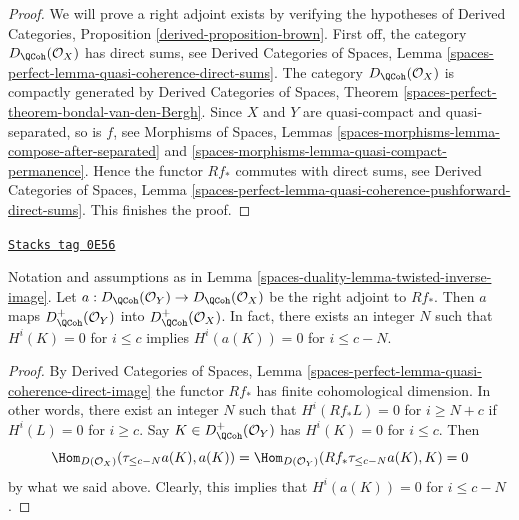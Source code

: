 \begin{proof}
We will prove a right adjoint exists by verifying the hypotheses of
Derived Categories, Proposition \ref{derived-proposition-brown}.
First off, the category $D_\QCoh(\mathcal{O}_X)$ has direct sums, see
Derived Categories of Spaces, Lemma
\ref{spaces-perfect-lemma-quasi-coherence-direct-sums}.
The category $D_\QCoh(\mathcal{O}_X)$ is compactly generated by
Derived Categories of Spaces, Theorem
\ref{spaces-perfect-theorem-bondal-van-den-Bergh}.
Since $X$ and $Y$ are quasi-compact and quasi-separated, so is $f$, see
Morphisms of Spaces, Lemmas
\ref{spaces-morphisms-lemma-compose-after-separated} and
\ref{spaces-morphisms-lemma-quasi-compact-permanence}.
Hence the functor $Rf_*$ commutes with direct sums, see
Derived Categories of Spaces, Lemma
\ref{spaces-perfect-lemma-quasi-coherence-pushforward-direct-sums}.
This finishes the proof.
\end{proof}

\begin{lemma}
\label{spaces-duality-lemma-twisted-inverse-image-bounded-below}
\href{https://stacks.math.columbia.edu/tag/0E56}{\texttt{Stacks tag 0E56}}

Notation and assumptions as in Lemma \ref{spaces-duality-lemma-twisted-inverse-image}.
Let $a : D_\QCoh(\mathcal{O}_Y) \to D_\QCoh(\mathcal{O}_X)$ be the right
adjoint to $Rf_*$. Then $a$ maps
$D^+_\QCoh(\mathcal{O}_Y)$ into $D^+_\QCoh(\mathcal{O}_X)$.
In fact, there exists an integer $N$ such that
$H^i(K) = 0$ for $i \leq c$ implies $H^i(a(K)) = 0$ for $i \leq c - N$.
\end{lemma}

\begin{proof}
By Derived Categories of Spaces, Lemma
\ref{spaces-perfect-lemma-quasi-coherence-direct-image}
the functor $Rf_*$ has finite cohomological dimension. In other words,
there exist an integer $N$ such that
$H^i(Rf_*L) = 0$ for $i \geq N + c$ if $H^i(L) = 0$ for $i \geq c$.
Say $K \in D^+_\QCoh(\mathcal{O}_Y)$ has $H^i(K) = 0$ for $i \leq c$.
Then
$$
\Hom_{D(\mathcal{O}_X)}(\tau_{\leq c - N}a(K), a(K)) =
\Hom_{D(\mathcal{O}_Y)}(Rf_*\tau_{\leq c - N}a(K), K) = 0
$$
by what we said above. Clearly, this implies that
$H^i(a(K)) = 0$ for $i \leq c - N$.
\end{proof}


